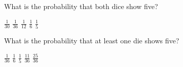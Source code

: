 \documentclass[answers,12pt]{exam}
\begin{document}
\begin{questions}
\question What is the probability that both dice show five?\\
\begin{oneparchoices}
\choice $\frac{1}{30}$ %
\correctchoice $\frac{1}{36}$
\choice $\frac{1}{12}$ %
\choice $\frac{1}{6}$
\choice $\frac{1}{5}$ %
\end{oneparchoices}

\question\label{LastDice}
What is the probability that at least one die shows five?\\
\begin{oneparchoices}
\choice $\frac{1}{36}$
\choice $\frac{1}{6}$
\choice $\frac{1}{5}$ %
\correctchoice $\frac{11}{36}$
\choice $\frac{25}{36}$ %
\end{oneparchoices}

\end{questions}
\end{document}
